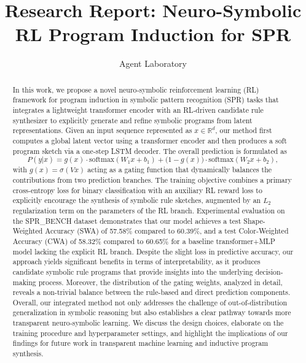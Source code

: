 \documentclass{article}
\title{Research Report: Neuro-Symbolic RL Program Induction for SPR}
\author{Agent Laboratory}
\date{}
\begin{document}
\maketitle

\begin{abstract}
In this work, we propose a novel neuro‐symbolic reinforcement learning (RL) framework for program induction in symbolic pattern recognition (SPR) tasks that integrates a lightweight transformer encoder with an RL‐driven candidate rule synthesizer to explicitly generate and refine symbolic programs from latent representations. Given an input sequence represented as \( x \in \mathbb{R}^d \), our method first computes a global latent vector using a transformer encoder and then produces a soft program sketch via a one‐step LSTM decoder. The overall prediction is formulated as 
\[
P(y|x) = g(x) \cdot \mathrm{softmax}(W_1 x + b_1) + \bigl(1-g(x)\bigr) \cdot \mathrm{softmax}(W_2 x + b_2),
\]
with \( g(x)=\sigma(Vx) \) acting as a gating function that dynamically balances the contributions from two prediction branches. The training objective combines a primary cross-entropy loss for binary classification with an auxiliary RL reward loss to explicitly encourage the synthesis of symbolic rule sketches, augmented by an \( L_2 \) regularization term on the parameters of the RL branch. Experimental evaluation on the SPR\_BENCH dataset demonstrates that our model achieves a test Shape-Weighted Accuracy (SWA) of 57.58\% compared to 60.39\%, and a test Color-Weighted Accuracy (CWA) of 58.32\% compared to 60.65\% for a baseline transformer+MLP model lacking the explicit RL branch. Despite the slight loss in predictive accuracy, our approach yields significant benefits in terms of interpretability, as it produces candidate symbolic rule programs that provide insights into the underlying decision-making process. Moreover, the distribution of the gating weights, analyzed in detail, reveals a non-trivial balance between the rule-based and direct prediction components. Overall, our integrated method not only addresses the challenge of out-of-distribution generalization in symbolic reasoning but also establishes a clear pathway towards more transparent neuro‐symbolic learning. We discuss the design choices, elaborate on the training procedure and hyperparameter settings, and highlight the implications of our findings for future work in transparent machine learning and inductive program synthesis.
\end{abstract}
\end{document}
